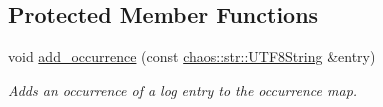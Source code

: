 \subsection*{Protected Member Functions}
\begin{DoxyCompactItemize}
\item 
\hypertarget{classchaos_1_1test_1_1log__formatter_1_1_abstract_test_log_formatter_a6a3ed5f138284b793e0b6a0783ac738b}{}void \hyperlink{classchaos_1_1test_1_1log__formatter_1_1_abstract_test_log_formatter_a6a3ed5f138284b793e0b6a0783ac738b}{add\+\_\+occurrence} (const \hyperlink{classchaos_1_1str_1_1_u_t_f8_string}{chaos\+::str\+::\+U\+T\+F8\+String} \&entry)\label{classchaos_1_1test_1_1log__formatter_1_1_abstract_test_log_formatter_a6a3ed5f138284b793e0b6a0783ac738b}

\begin{DoxyCompactList}\small\item\em Adds an occurrence of a log entry to the occurrence map. \end{DoxyCompactList}\end{DoxyCompactItemize}
